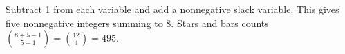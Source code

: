 Subtract 1 from each variable and add a nonnegative slack variable. This gives five nonnegative integers summing to 8. Stars and bars counts $\binom{8+5-1}{5-1}=\binom{12}{4}=\boxed{495}$.
